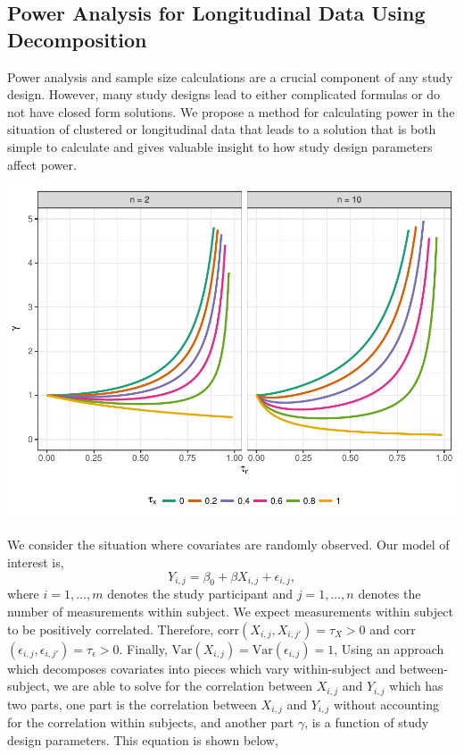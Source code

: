 \documentclass[12pt]{article}
\begin{document}
\begin{multicols}{2}
\subsection*{Power Analysis for Longitudinal Data Using Decomposition}
Power analysis and sample size calculations are a crucial component of any study design. However, many study designs lead to either complicated formulas or do not have closed form solutions. We propose a method for calculating power in the situation of clustered or longitudinal data that leads to a solution that is both simple to calculate and gives valuable insight to how study design parameters affect power.
\begin{center}\vspace{.5cm}
\includegraphics[width=1\linewidth]{gamma_analysis.pdf}
\label{fig:gamma}
\end{center}\vspace{.5cm}
\hspace{.5cm}We consider the situation where covariates are randomly observed. Our model of interest is,
\begin{equation} \label{eq:model}
Y_{i,j}=\beta_0+ \beta X_{i,j}+ \epsilon_{i,j},
\end{equation}
where $i=1,\ldots, m$ denotes the study participant and $j=1,\ldots,n$ denotes the number of measurements within subject. We expect measurements within subject to be positively correlated. Therefore, corr$(X_{i,j},X_{i,j'}) = \tau_X >0$ and corr$(\epsilon_{i,j},\epsilon_{i,j'}) = \tau_\epsilon>0$. Finally, $\mbox{Var}(X_{i,j}) = \mbox{Var}(\epsilon_{i,j}) =1$, Using an approach which decomposes covariates into pieces which vary within-subject and between-subject, we are able to solve for the correlation between $X_{i,j}$ and $Y_{i,j}$ which has two parts, one part is the correlation between $X_{i,j}$ and $Y_{i,j}$ without accounting for the correlation within subjects, and another part $\gamma$, is a function of study design parameters. This equation is shown below, 

\end{multicols}
\end{document}
